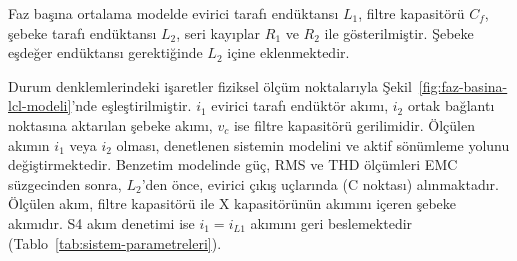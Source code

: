 Faz başına ortalama modelde evirici tarafı endüktansı $L_1$, filtre kapasitörü $C_f$, şebeke tarafı endüktansı $L_2$, seri kayıplar $R_1$ ve $R_2$ ile gösterilmiştir. Şebeke eşdeğer endüktansı gerektiğinde $L_2$ içine eklenmektedir.

Durum denklemlerindeki işaretler fiziksel ölçüm noktalarıyla Şekil~\ref{fig:faz-basina-lcl-modeli}'nde eşleştirilmiştir. $i_1$ evirici tarafı endüktör akımı, $i_2$ ortak bağlantı noktasına aktarılan şebeke akımı, $v_c$ ise filtre kapasitörü gerilimidir. Ölçülen akımın $i_1$ veya $i_2$ olması, denetlenen sistemin modelini ve aktif sönümleme yolunu değiştirmektedir. Benzetim modelinde güç, RMS ve THD ölçümleri EMC süzgecinden sonra, $L_2$'den önce, evirici çıkış uçlarında (C noktası) alınmaktadır. Ölçülen akım, filtre kapasitörü ile X kapasitörünün akımını içeren şebeke akımıdır. S4 akım denetimi ise $i_1=i_{L1}$ akımını geri beslemektedir (Tablo~\ref{tab:sistem-parametreleri}).


